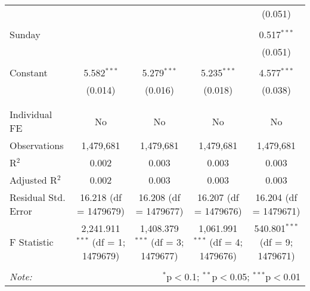 \documentclass[
]{article}
\begin{document}
\begin{table}[!htbp]
{\begin{tabular}{@{\extracolsep{5pt}}lcccc}
  &  &  &  & (0.051) \\ 
  & & & & \\ 
 Sunday &  &  &  & 0.517$^{***}$ \\ 
  &  &  &  & (0.051) \\ 
  & & & & \\ 
 Constant & 5.582$^{***}$ & 5.279$^{***}$ & 5.235$^{***}$ & 4.577$^{***}$ \\ 
  & (0.014) & (0.016) & (0.018) & (0.038) \\ 
  & & & & \\ 
\hline \\[-1.8ex] 
Individual FE & No & No & No & No \\ 
Observations & 1,479,681 & 1,479,681 & 1,479,681 & 1,479,681 \\ 
R$^{2}$ & 0.002 & 0.003 & 0.003 & 0.003 \\ 
Adjusted R$^{2}$ & 0.002 & 0.003 & 0.003 & 0.003 \\ 
Residual Std. Error & 16.218 (df = 1479679) & 16.208 (df = 1479677) & 16.207 (df = 1479676) & 16.204 (df = 1479671) \\ 
F Statistic & 2,241.911$^{***}$ (df = 1; 1479679) & 1,408.379$^{***}$ (df = 3; 1479677) & 1,061.991$^{***}$ (df = 4; 1479676) & 540.801$^{***}$ (df = 9; 1479671) \\ 
\hline 
\hline \\[-1.8ex] 
\textit{Note:}  & \multicolumn{4}{r}{$^{*}$p$<$0.1; $^{**}$p$<$0.05; $^{***}$p$<$0.01} \\ 
\end{tabular}
} 
\end{table} 
\newpage
\end{document}
